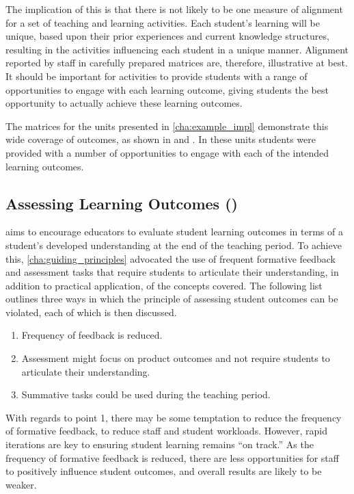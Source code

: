 The implication of this is that there is not likely to be one measure of alignment for a set of teaching and learning activities. Each student's learning will be unique, based upon their prior experiences and current knowledge structures, resulting in the activities influencing each student in a unique manner. Alignment reported by staff in carefully prepared matrices are, therefore, illustrative at best. It should be important for activities to provide students with a range of opportunities to engage with each learning outcome, giving students the best opportunity to actually achieve these learning outcomes. 

The matrices for the units presented in \cref{cha:example_impl} demonstrate this wide coverage of outcomes, as shown in  and . In these units students were provided with a number of opportunities to engage with each of the intended learning outcomes. 


\subsection{Assessing Learning Outcomes ()} %
\label{sub:assessing_learning_outcomes}

 aims to encourage educators to evaluate student learning outcomes in terms of a student's developed understanding at the end of the teaching period. To achieve this, \cref{cha:guiding_principles} advocated the use of frequent formative feedback and assessment tasks that require students to articulate their understanding, in addition to practical application, of the concepts covered. The following list outlines three ways in which the principle of assessing student outcomes can be violated, each of which is then discussed. 

\begin{enumerate}
	\item Frequency of feedback is reduced.
	\item Assessment might focus on product outcomes and not require students to articulate their understanding.
	\item Summative tasks could be used during the teaching period.
\end{enumerate}

With regards to point 1, there may be some temptation to reduce the frequency of formative feedback, to reduce staff and student workloads. However, rapid iterations are key to ensuring student learning remains ``on track.'' As the frequency of formative feedback is reduced, there are less opportunities for staff to positively influence student outcomes, and overall results are likely to be weaker.

